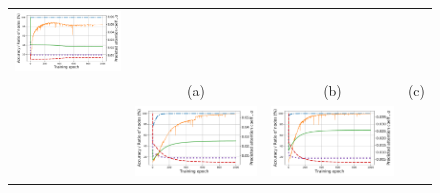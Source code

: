 \begin{figure}[thb]
\begin{center}
\begin{small}
\begin{tabular}{cccc}
				{\includegraphics[width=\width, align=c, trim={0cm 0cm 0.5cm 0cm}, clip]{colors_init/optimal4_unsup}} \\
				& (a) & (b) & (c) \\
				\rotatebox[origin=c]{90}{\small \textsc{Supervised}} &
				{\includegraphics[width=\width, align=c, trim={0cm 0cm 0.5cm 0cm}, clip]{colors_init/bad_sup}} & %
				{\includegraphics[width=\width, align=c, trim={0cm 0cm 0.5cm 0cm}, clip]{colors_init/good1_sup}} &

\end{tabular}
\end{small}
\end{center}
\end{figure}
